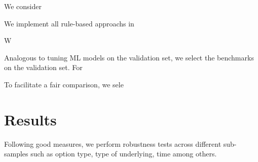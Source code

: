 We consider 


We implement all rule-based approachs in 


W

Analogous to tuning ML models on the validation set, we select the benchmarks on the validation set. For 


To facilitate a fair comparison, we sele


\section{Results}

Following good measures, we perform robustness tests across different sub-samples such as option type, type of underlying, time among others. 


